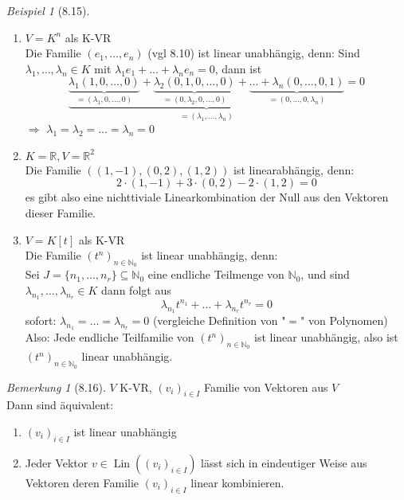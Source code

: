 \documentclass[a4paper]{scrartcl}
\DeclareMathOperator{\Lin}{Lin}
\theoremstyle{definition}
\theoremstyle{plain}
\theoremstyle{plain}
\theoremstyle{remark}
\newtheorem{remark}{Bemerkung}
\theoremstyle{remark}
\theoremstyle{remark}
\newtheorem{ex}{Beispiel}
\begin{document}
\begin{ex}[8.15]
\mbox{}
\begin{enumerate}
\item $V = K^n$ als K-VR \\
     Die Familie $(e_1, \ldots, e_n)$ (vgl 8.10) ist linear unabhängig, denn:
Sind $\lambda_1, \ldots, \lambda_n \in K$ mit $\lambda_1 e_1 + \ldots + \lambda_n e_n = 0$, dann ist
\[\underbrace{\underbrace{\lambda_1 (1, 0, \ldots, 0)}_{=(\lambda_1, 0, \ldots, 0)} + \underbrace{\lambda_2 (0, 1, 0, \ldots, 0)}_{= (0, \lambda_2, 0, \ldots, 0)} + \underbrace{\ldots + \lambda_n (0, \ldots, 0, 1)}_{=(0,\ldots,0,\lambda_n)}}_{= (\lambda_1, \ldots, \lambda_n)} = 0\]
$\Rightarrow$ $\lambda_1 = \lambda_2 = \ldots = \lambda_n = 0$
\item $K = \mathbb{R}, V = \mathbb{R}^2$ \\
     Die Familie $((1, -1), (0,2), (1,2))$ ist linearabhängig, denn:
\[2\cdot(1,-1) + 3\cdot(0,2) - 2\cdot(1,2) = 0\]
es gibt also eine nichttiviale Linearkombination der Null aus den Vektoren dieser Familie.
\item $V = K[t]$ als K-VR \\
     Die Familie $(t^n)_{n\in \mathbb{N}_0}$ ist linear unabhängig, denn: \\
     Sei $J = \{n_1, \ldots, n_r\} \subseteq \mathbb{N}_0$ eine endliche Teilmenge von $\mathbb{N}_0$, und sind $\lambda_{n_1}, \ldots, \lambda_{n_r} \in K$
dann folgt aus
\[\lambda_{n_1}t^{n_1} + \ldots + \lambda_{n_r} t^{n_r} = 0\]
sofort: $\lambda_{n_1} = \ldots = \lambda_{n_r} = 0$ (vergleiche Definition von "$=$" von Polynomen)
Also: Jede endliche Teilfamilie von $(t^n)_{n\in\mathbb{N}_0}$ ist linear unabhängig, also ist $(t^n)_{n\in\mathbb{N}_0}$ linear unabhängig.
\end{enumerate}
\end{ex}
\begin{remark}[8.16]
$V$ K-VR, $(v_i)_{i\in I}$ Familie von Vektoren aus $V$ \\
  Dann sind äquivalent:
\begin{enumerate}
\item $(v_i)_{i \in I}$ ist linear unabhängig
\item Jeder Vektor $v \in \Lin((v_i)_{i\in I})$ lässt sich in eindeutiger Weise aus Vektoren deren Familie $(v_i)_{i\in I}$ linear kombinieren.
\end{enumerate}
\end{remark}
\end{document}
